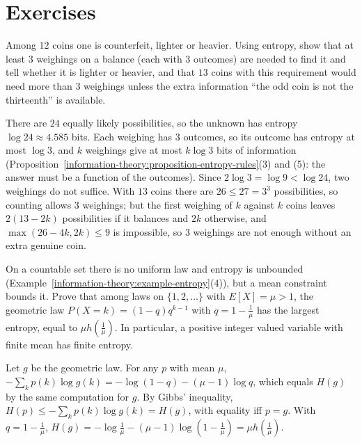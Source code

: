 \section{Exercises}\label{information-theory:section-exercises}

\begin{exercise}\label{information-theory:exercise-twelve-coins}
Among $12$ coins one is counterfeit, lighter or heavier. Using entropy, show that at least $3$ weighings on a balance (each with $3$ outcomes) are needed to find it and tell whether it is lighter or heavier, and that $13$ coins
with this requirement would need more than $3$ weighings unless the extra information ``the odd coin is not the thirteenth'' is available.
\end{exercise}

\begin{solution}
There are $24$ equally likely possibilities, so the unknown has entropy $\log 24 \approx 4.585$ bits. Each weighing has $3$ outcomes, so its outcome has entropy at most $\log 3$, and $k$ weighings give at most $k\log 3$ bits of
information (Proposition~\ref{information-theory:proposition-entropy-rules}(3) and (5): the answer must be a function of the outcomes). Since $2\log 3 = \log 9 < \log 24$, two weighings do not suffice. With $13$ coins there are
$26 \leq 27 = 3^3$ possibilities, so counting allows $3$ weighings; but the first weighing of $k$ against $k$ coins leaves $2(13 - 2k)$ possibilities if it balances and $2k$ otherwise, and $\max(26 - 4k, 2k) \leq 9$ is impossible,
so $3$ weighings are not enough without an extra genuine coin.
\end{solution}

\begin{exercise}\label{information-theory:exercise-entropy-function}
On a countable set there is no uniform law and entropy is unbounded (Example~\ref{information-theory:example-entropy}(4)), but a mean constraint bounds it. Prove that among laws on $\{1, 2, \ldots\}$ with $E[X] = \mu > 1$, the geometric law
$P(X = k) = (1 - q)q^{k-1}$ with $q = 1 - \frac1\mu$ has the largest entropy, equal to $\mu h(\frac1\mu)$. In particular, a positive integer valued variable with finite mean has finite entropy.
\end{exercise}

\begin{solution}
Let $g$ be the geometric law. For any $p$ with mean $\mu$, $-\sum_kp(k)\log g(k) = -\log(1 - q) - (\mu - 1)\log q$, which equals $H(g)$ by the same computation for $g$. By Gibbs' inequality, $H(p) \leq -\sum_kp(k)\log g(k) = H(g)$, with
equality iff $p = g$. With $q = 1 - \frac1\mu$, $H(g) = -\log\frac1\mu - (\mu - 1)\log(1 - \frac1\mu) = \mu h(\frac1\mu)$.
\end{solution}

